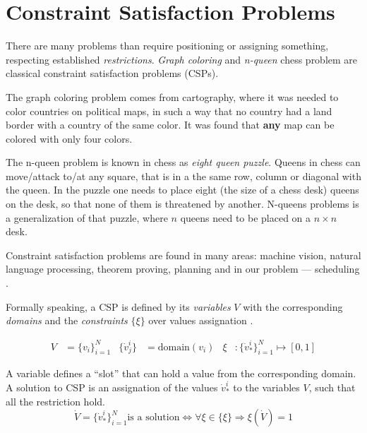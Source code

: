 \def\domain{\mathrm{domain}}

\section{Constraint Satisfaction Problems}

There are many problems than require positioning or assigning something,
respecting established \emph{restrictions}. \emph{Graph coloring} and
\emph{n-queen} chess problem are classical constraint satisfaction problems (CSPs).

The graph coloring problem comes from cartography, where it was needed to color
countries on political maps, in such a way that no country had a land border with
a country of the same color. It was found that \textbf{any} map can be colored
with only four colors.

The n-queen problem is known in chess as \emph{eight queen puzzle}.
Queens in chess can move/attack to/at any square,
that is in a the same row, column or diagonal with the queen.
In the puzzle one needs to place eight (the size of a chess desk)
queens on the desk, so that none of them is threatened by another.
N-queens problems is a generalization of that puzzle, where $n$ queens need
to be placed on a $n \times n$ desk.

Constraint satisfaction problems are found in many areas:
machine vision, natural language processing, theorem proving,
planning and in our problem --- scheduling \cite{MAS}.

\bigskip
\noindent
Formally speaking, a CSP is defined by its \emph{variables} $V$ with the
corresponding \emph{domains} and the \emph{constraints} $\{\xi\}$
over values assignation \cite{MAS}.

\begin{align*}
  V                &= \{v_i\}_{i=1}^N
& \{{\dot v}^i_j\} &= \domain(v_i)
& \xi              &: \{{\dot v}^i_\ast\}_{i=1}^N \mapsto [0,1]
\end{align*}


A variable defines a ``slot'' that can hold a value from the corresponding domain.
A solution to CSP is an assignation of the values ${\dot v}^i_\ast$
to the variables $V$, such that all the restriction hold.
\begin{equation}
  {\dot V} = \{{\dot v}^i_\ast\}_{i=1}^N \text{is a solution}
   \iff \forall \xi \in \{\xi\} \Rightarrow \xi({\dot V}) = 1
\end{equation}

